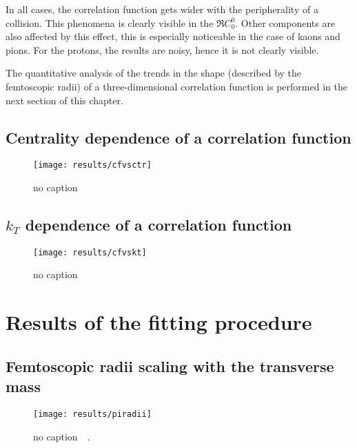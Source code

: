       In all cases, the correlation function gets wider with the peripherality of a collision.
      This phenomena is clearly visible in the $\Re C^0_0$.
      Other components are also affected by this effect, this is especially noticeable in the case of kaons and pions.
      For the protons, the results are noisy, hence it is not clearly visible.

      The quantitative analysis of the trends in the shape (described by the femtoscopic radii) of a three-dimensional correlation function is performed in the next section of this chapter.
    \FloatBarrier
    \subsection{Centrality dependence of a correlation function}
      \begin{figure}[h]
        \centering
        \centerline{\texttt{[image: results/cfvsctr]}}
        \caption{no caption}
      \label{fig:centr_dep}
      \end{figure}
    \FloatBarrier
    \subsection{$k_T$ dependence of a correlation function}
      \begin{figure}[h]
        \centering
        \centerline{\texttt{[image: results/cfvskt]}}
        \caption{no caption}
      \label{fig:kt_dep}
      \end{figure}
    \FloatBarrier
  \section{Results of the fitting procedure}
    \subsection{Femtoscopic radii scaling with the transverse mass}
      \begin{figure}[h]
        \centering
        \centerline{\texttt{[image: results/piradii]}}
        \caption{no caption~\cite{alice_pion}~\cite{galazyn}.}
      \label{fig:piradii}
      \end{figure}



